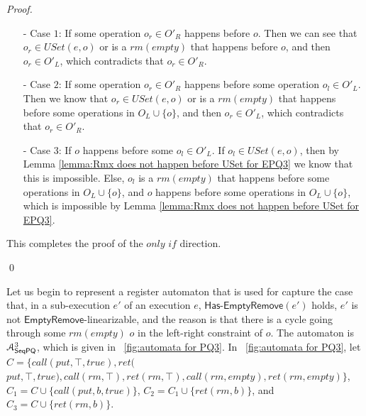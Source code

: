 \begin {proof}
\begin{itemize}
\setlength{\itemsep}{0.5pt}
\item[-] Case $1$: If some operation $o_r \in O'_R$ happens before $o$. Then we can see that $o_r \in \textit{USet}(e,o)$ or is a $\textit{rm}(\textit{empty})$ that happens before $o$, and then $o_r \in O'_L$, which contradicts that $o_r \in O'_R$.

\item[-] Case $2$: If some operation $o_r \in O'_R$ happens before some operation $o_l \in O'_L$. Then we know that $o_r \in \textit{USet}(e,o)$ or is a $\textit{rm}(\textit{empty})$ that happens before some operations in $O_L \cup \{ o \}$, and then $o_r \in O'_L$, which contradicts that $o_r \in O'_R$.

\item[-] Case $3$: If $o$ happens before some $o_l \in O'_L$. If $o_l \in \textit{USet}(e,o)$, then by Lemma \ref{lemma:Rmx does not happen before USet for EPQ3} we know that this is impossible. Else, $o_l$ is a $\textit{rm}(\textit{empty})$ that happens before some operations in $O_L \cup \{ o \}$, and $o$ happens before some operations in $O_L \cup \{ o \}$, which is impossible by Lemma \ref{lemma:Rmx does not happen before USet for EPQ3}.
\end{itemize}

This completes the proof of the $\textit{only if}$ direction.

\qed
\end {proof}

Let us begin to represent a register automaton that is used for capture the case that, in a sub-execution $e'$ of an execution $e$, $\mathsf{Has\text{-}EmptyRemove}(e')$ holds, $e'$ is not $\mathsf{EmptyRemove}$-linearizable, and the reason is that there is a cycle going through some $\textit{rm}(\textit{empty})$ $o$ in the left-right constraint of $o$. The automaton is $\mathcal{A}_{\mathsf{SeqPQ}}^3$, which is given in \figurename~\ref{fig:automata for PQ3}. In \figurename~\ref{fig:automata for PQ3}, let $C = \{ \textit{call}(\textit{put},\top,\textit{true}),\textit{ret}($ $\textit{put},\top,\textit{true}), \textit{call}(\textit{rm},\top), \textit{ret}(\textit{rm},\top),\textit{call}(\textit{rm},\textit{empty}),\textit{ret}(\textit{rm},\textit{empty}) \}$, $C_1 = C \cup \{ \textit{call}(\textit{put},b,\textit{true}) \}$, $C_2 = C_1 \cup \{ \textit{ret}(\textit{rm},b) \}$, and $C_3 = C \cup \{ \textit{ret}(\textit{rm},b) \}$.

